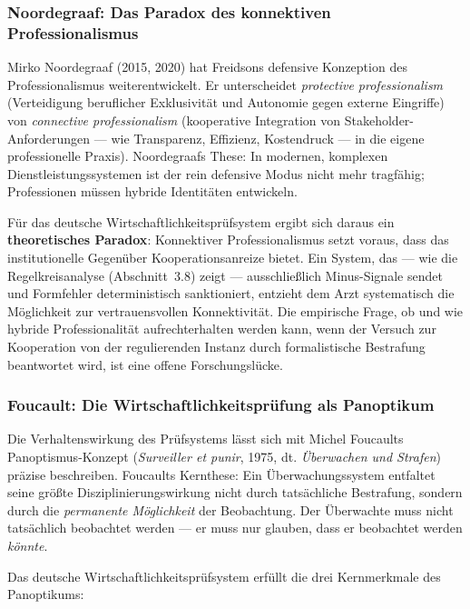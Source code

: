 \documentclass{umbruch-position}
\begin{document}
\subsubsection{Noordegraaf: Das Paradox des konnektiven Professionalismus}

Mirko Noordegraaf (2015, 2020) hat Freidsons defensive Konzeption des Professionalismus weiterentwickelt. Er unterscheidet \textit{protective professionalism} (Verteidigung beruflicher Exklusivität und Autonomie gegen externe Eingriffe) von \textit{connective professionalism} (kooperative Integration von Stakeholder-Anforderungen --- wie Transparenz, Effizienz, Kostendruck --- in die eigene professionelle Praxis). Noordegraafs These: In modernen, komplexen Dienstleistungssystemen ist der rein defensive Modus nicht mehr tragfähig; Professionen müssen hybride Identitäten entwickeln.

Für das deutsche Wirtschaftlichkeitsprüfsystem ergibt sich daraus ein \textbf{theoretisches Paradox}: Konnektiver Professionalismus setzt voraus, dass das institutionelle Gegenüber Kooperationsanreize bietet. Ein System, das --- wie die Regelkreisanalyse (Abschnitt~3.8) zeigt --- ausschließlich Minus-Signale sendet und Formfehler deterministisch sanktioniert, entzieht dem Arzt systematisch die Möglichkeit zur vertrauensvollen Konnektivität. Die empirische Frage, ob und wie hybride Professionalität aufrechterhalten werden kann, wenn der Versuch zur Kooperation von der regulierenden Instanz durch formalistische Bestrafung beantwortet wird, ist eine offene Forschungslücke.

\subsubsection{Foucault: Die Wirtschaftlichkeitsprüfung als Panoptikum}

Die Verhaltenswirkung des Prüfsystems lässt sich mit Michel Foucaults Panoptismus-Konzept (\textit{Surveiller et punir}, 1975, dt. \textit{Überwachen und Strafen}) präzise beschreiben. Foucaults Kernthese: Ein Überwachungssystem entfaltet seine größte Disziplinierungswirkung nicht durch tatsächliche Bestrafung, sondern durch die \textit{permanente Möglichkeit} der Beobachtung. Der Überwachte muss nicht tatsächlich beobachtet werden --- er muss nur glauben, dass er beobachtet werden \textit{könnte}.

Das deutsche Wirtschaftlichkeitsprüfsystem erfüllt die drei Kernmerkmale des Panoptikums:
\end{document}
